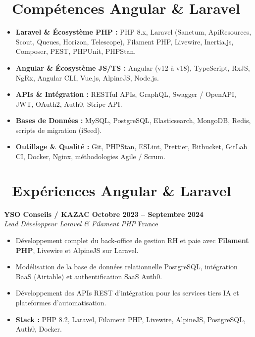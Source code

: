 \documentclass[10pt,a4paper]{article}
\begin{document}
\section{\faCogs\ Compétences Angular \& Laravel}
\begin{itemize}[leftmargin=1.4em, itemsep=0.25em, topsep=0.15em]
    \item \textbf{Laravel \& Écosystème PHP :} PHP 8.x, Laravel (Sanctum, ApiResources, Scout, Queues, Horizon, Telescope), Filament PHP, Livewire, Inertia.js, Composer, PEST, PHPUnit, PHPStan.
    \item \textbf{Angular \& Écosystème JS/TS :} Angular (v12 à v18), TypeScript, RxJS, NgRx, Angular CLI, Vue.js, AlpineJS, Node.js.
    \item \textbf{APIs \& Intégration :} RESTful APIs, GraphQL, Swagger / OpenAPI, JWT, OAuth2, Auth0, Stripe API.
    \item \textbf{Bases de Données :} MySQL, PostgreSQL, Elasticsearch, MongoDB, Redis, scripts de migration (iSeed).
    \item \textbf{Outillage \& Qualité :} Git, PHPStan, ESLint, Prettier, Bitbucket, GitLab CI, Docker, Nginx, méthodologies Agile / Scrum.
\end{itemize}

\section{\faBriefcase\ Expériences Angular \& Laravel}

\textbf{\large YSO Conseils / KAZAC} \hfill {\bfseries\small\color{slateGray} Octobre 2023 -- Septembre 2024} \\
\emph{\color{primary}Lead Développeur Laravel \& Filament PHP} \hfill {\small France}
\begin{itemize}[leftmargin=1.4em, itemsep=0.18em, topsep=0.15em]
    \item Développement complet du back-office de gestion RH et paie avec \textbf{Filament PHP}, Livewire et AlpineJS sur Laravel.
    \item Modélisation de la base de données relationnelle PostgreSQL, intégration BaaS (Airtable) et authentification SaaS Auth0.
    \item Développement des APIs REST d'intégration pour les services tiers IA et plateformes d'automatisation.
    \item \textbf{Stack :} PHP 8.2, Laravel, Filament PHP, Livewire, AlpineJS, PostgreSQL, Auth0, Docker.
\end{itemize}
\end{document}
